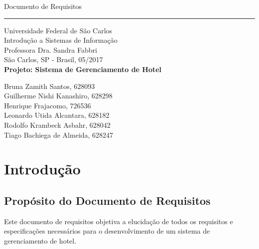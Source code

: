 \documentclass[notitlepage]{article}
\begin{document}
\begin{flushright}
    \begin{bfseries}
        \Huge{Documento de Requisitos}\\
    \end{bfseries}
    \rule{16cm}{3pt}\vskip1cm
\end{flushright}

	\begin{center}
		\large{Universidade Federal de São Carlos}\\
		\large{Introdução a Sistemas de Informação}\\ 
		\large{Professora Dra. Sandra Fabbri}\\
		\large{São Carlos, SP - Brasil, 05/2017}\\
        \vspace{45pt}
        \textbf{\LARGE{Projeto: Sistema de Gerenciamento de Hotel}}\\
		\vspace{1,5cm}
	\end{center}
	
	\begin{flushleft}
		\begin{tabbing}
		Bruna Zamith Santos, 628093\\
		Guilherme Nishi Kanashiro, 628298\\
		Henrique Frajacomo, 726536\\
		Leonardo Utida Alcantara, 628182\\
		Rodolfo Krambeck Asbahr, 628042\\
		Tiago Bachiega de Almeida, 628247
	\end{tabbing}
 \end{flushleft}
	\vspace{1cm}
\nopagebreak



\section{Introdução}
\subsection{Propósito do Documento de Requisitos}
Este documento de requisitos objetiva a elucidação de todos os requisitos e especificações necessários para o desenvolvimento de um sistema de gerenciamento de hotel.
\end{document}
